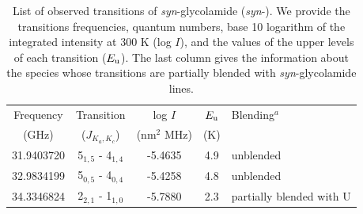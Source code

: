 \documentclass[twocolumn]{aastex63}
\begin{document}
\begin{table}
\centering
\tabcolsep 4.5pt
\caption{List of observed transitions of {\it syn}-glycolamide ({\it syn}-). We provide the transitions frequencies, quantum numbers, base 10 logarithm of the integrated intensity at 300 K (log $I$), and the values of the upper levels of each transition ($E_{\rm u}$). The last column gives the information about the species whose transitions are partially blended with {\it syn}-glycolamide lines.}
\begin{tabular}{ c c c c l}
\hline
 Frequency & Transition  & log $I$ & $E_{\rm u}$  & Blending$^a$ \\
 (GHz) & ($J_{K_a,K_c}$)  &   (nm$^2$ MHz)  & (K) &   \\
\hline
 31.9403720   & 5$_{1,5}$ - 4$_{1,4}$  & -5.4635 & 4.9 &  unblended \\ 
 32.9834199  & 5$_{0,5}$ - 4$_{0,4}$  & -5.4258 & 4.8 & unblended \\ 
34.3346824    & 2$_{2,1}$ - 1$_{1,0}$  & -5.7880 & 2.3 &   partially blended with U  \\ 


\end{tabular}
\end{table}
\end{document}
